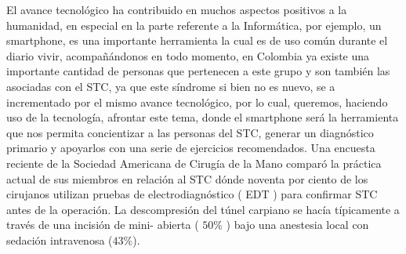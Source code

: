 \documentclass[a4paper,man,natbib]{apa6}
\begin{document}
El avance tecnológico ha contribuido en muchos aspectos positivos  a la humanidad, en especial en la parte referente a la Informática, por ejemplo, un smartphone, es una importante herramienta la cual es de uso común durante el diario vivir, acompañándonos en todo momento, en Colombia ya existe una importante cantidad de personas que pertenecen a este grupo \cite{f4} y son también las asociadas con el STC, ya que este síndrome si bien no es nuevo, se a incrementado por el mismo avance tecnológico, por lo cual, queremos, haciendo uso de la tecnología, afrontar este tema, donde el smartphone será la herramienta que nos permita concientizar a las personas del STC, generar un diagnóstico primario y apoyarlos con una serie de ejercicios recomendados. Una encuesta reciente de la Sociedad Americana de Cirugía de la Mano comparó la práctica actual de sus miembros en relación al STC dónde noventa por ciento de los cirujanos utilizan pruebas de electrodiagnóstico ( EDT ) para confirmar STC antes de la operación. La descompresión del túnel carpiano se hacía típicamente a través de una incisión de mini- abierta ( $50\%$ ) bajo una anestesia local con sedación intravenosa ($43\%$). \cite{s3}
\end{document}
